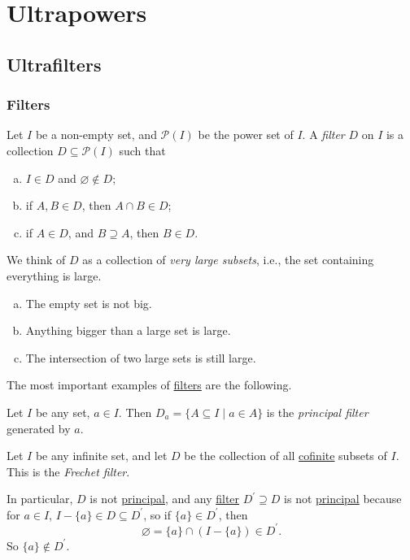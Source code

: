 \chapter{Ultrapowers}
\section{Ultrafilters}
\subsection{Filters}
\begin{definition}[Filter]\label{def:filter}
	Let \(I\) be a non-empty set, and \(\mathcal{P} (I)\) be the power set of \(I\). A \emph{filter} \(D\) on \(I\) is a collection \(D \subseteq \mathcal{P} (I)\) such that
	\begin{enumerate}[(a)]
		\item \(I\in D\) and \(\varnothing \notin D\);
		\item if \(A, B\in D\), then \(A \cap B\in D\);
		\item if \(A\in D\), and \(B \supseteq A\), then \(B\in D\).
	\end{enumerate}
\end{definition}

\begin{intuition}
	We think of \(D\) as a collection of \emph{very large subsets}, i.e., the set containing everything is large.
	\begin{enumerate}[(a)]
		\item The empty set is not big.
		\item Anything bigger than a large set is large.
		\item The intersection of two large sets is still large.
	\end{enumerate}
\end{intuition}

The most important examples of \hyperref[def:filter]{filters} are the following.

\begin{eg}\label{eg:principal-filter}
	Let \(I\) be any set, \(a\in I\). Then \(D_a = \{A \subseteq I \mid a\in A\}\) is the \emph{principal filter} generated by \(a\).
\end{eg}

\begin{eg}\label{eg:Frechet-filter}
	Let \(I\) be any infinite set, and let \(D\) be the collection of all \hyperref[def:cofinite]{cofinite} subsets of \(I\). This is the \emph{Frechet filter}.

	In particular, \(D\) is not \hyperref[eg:principal-filter]{principal}, and any \hyperref[def:filter]{filter} \(D^{\prime} \supseteq D\) is not \hyperref[eg:principal-filter]{principal} because for \(a\in I\), \(I - \{a\} \in D \subseteq D^{\prime} \), so if \(\{a\} \in D^{\prime} \), then
	\[
		\varnothing = \{a\} \cap (I - \{a\}) \in D^{\prime} .
	\]
	So \(\{a\} \notin D^{\prime} \).
\end{eg}

